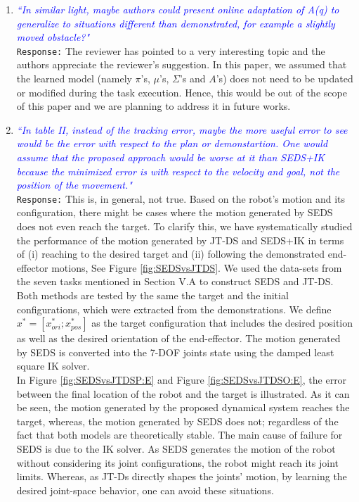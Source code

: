 \documentclass{article}
\begin{document}
\begin{enumerate}
\item \textcolor{blue}{\textit{``In similar light, maybe authors could present online adaptation of
A(q) to generalize to situations different than demonstrated, for
example a slightly moved obstacle?"}}\\
\texttt{Response:} \small The reviewer has pointed to a very interesting topic and the authors appreciate the reviewer’s suggestion. In this paper, we assumed that the learned model (namely $ \pi $'s, $ \mu $'s, $ \Sigma $'s and $A$'s) does not need to be updated or modified during the task execution. Hence, this would be out of the scope of this paper and we are planning to address it in future works.

\item \textcolor{blue}{\textit{``In table II, instead of the tracking error, maybe the more useful
error to see would be the error with respect to the plan or
demonstartion. One would assume that the proposed approach would be
worse at it than SEDS+IK because the minimized error is with respect to
the velocity and goal, not the position of the movement."}}\\
\texttt{Response:} \small This is, in general, not true. Based on the robot's motion and its configuration, there might be cases where the motion generated by SEDS does not even reach the target. To clarify this, we have systematically studied the performance of the motion generated by JT-DS and SEDS+IK in terms of (i) reaching to the desired target and (ii) following the demonstrated end-effector motions, See Figure \ref{fig:SEDSvsJTDS}. We used the data-sets from the seven tasks mentioned in Section V.A to construct SEDS and JT-DS. Both methods are tested by the same the target and the initial configurations, which were extracted from the demonstrations. We define $ x^*=[x^*_{ori};x^*_{pos}] $ as the target configuration that includes the desired position as well as the desired  orientation of the end-effector. The motion generated by SEDS is converted into the 7-DOF joints state using the damped least square IK solver.\\ 
In Figure \ref{fig:SEDSvsJTDSP:E} and Figure \ref{fig:SEDSvsJTDSO:E}, the error between the final location of the robot and the target is illustrated. As it can be seen, the motion generated by the proposed dynamical system reaches the target, whereas, the motion generated by SEDS does not; regardless of the fact that both models are theoretically stable. The main cause of failure for SEDS is due to the IK solver. As SEDS generates the motion of the robot without considering its joint configurations, the robot might reach its joint limits.  Whereas, as JT-Ds directly shapes the joints' motion, by learning the desired joint-space behavior, one can avoid these situations.  


\end{enumerate}
\end{document}
